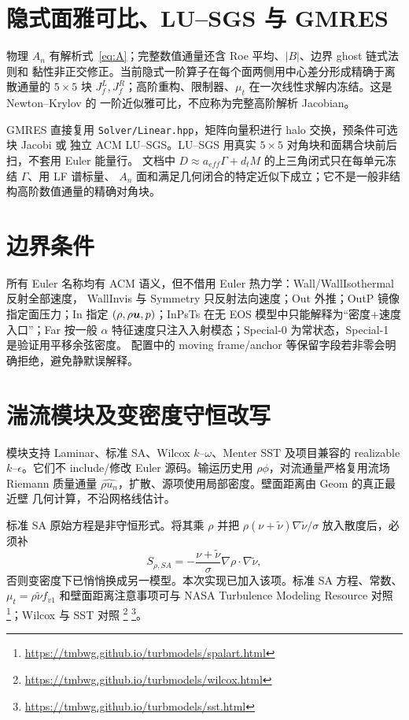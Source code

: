 \documentclass[UTF8,11pt,a4paper]{ctexart}
\begin{document}
\section{隐式面雅可比、LU--SGS 与 GMRES}
物理 $A_n$ 有解析式~\eqref{eq:A}；完整数值通量还含 Roe 平均、$|B|$、边界 ghost 链式法则和
黏性非正交修正。当前隐式一阶算子在每个面两侧用中心差分形成精确于离散通量的 $5\times5$
块 $J_f^L,J_f^R$；高阶重构、限制器、$\mu_t$ 在一次线性求解内冻结。这是 Newton--Krylov 的
一阶近似雅可比，不应称为完整高阶解析 Jacobian。

GMRES 直接复用 \texttt{Solver/Linear.hpp}，矩阵向量积进行 halo 交换，预条件可选块 Jacobi 或
独立 ACM LU--SGS。LU--SGS 用真实 $5\times5$ 对角块和面耦合块前后扫，不套用 Euler 能量行。
文档中 $D\approx a_{eff}\Gamma+d_tM$ 的上三角闭式只在每单元冻结 $\Gamma$、用 LF 谱标量、
$A_n$ 面和满足几何闭合的特定近似下成立；它不是一般非结构高阶数值通量的精确对角块。

\section{边界条件}
所有 Euler 名称均有 ACM 语义，但不借用 Euler 热力学：Wall/WallIsothermal 反射全部速度，
WallInvis 与 Symmetry 只反射法向速度；Out 外推；OutP 镜像指定面压力；In 指定
$(\rho,\rho\bm{u},p)$；InPsTs 在无 EOS 模型中只能解释为“密度+速度入口”；Far 按一般
$\alpha$ 特征速度只注入入射模态；Special-0 为常状态，Special-1 是验证用平移余弦密度。
配置中的 moving frame/anchor 等保留字段若非零会明确拒绝，避免静默误解释。

\section{湍流模块及变密度守恒改写}
模块支持 Laminar、标准 SA、Wilcox $k$--$\omega$、Menter SST 及项目兼容的 realizable
$k$--$\epsilon$。它们不 include/修改 Euler 源码。输运历史用 $\rho\phi$，对流通量严格复用流场
Riemann 质量通量 $\widehat{\rho u_n}$，扩散、源项使用局部密度。壁面距离由 Geom 的真正最近壁
几何计算，不沿网格线估计。

标准 SA 原始方程是非守恒形式。将其乘 $\rho$ 并把
$\rho(\nu+\tilde\nu)\nabla\tilde\nu/\sigma$ 放入散度后，必须补
\begin{equation}S_{\rho,SA}=-\frac{\nu+\tilde\nu}{\sigma}
\nabla\rho\cdot\nabla\tilde\nu,\end{equation}
否则变密度下已悄悄换成另一模型。本次实现已加入该项。标准 SA 方程、常数、$\mu_t=\rho
\tilde\nu f_{v1}$ 和壁面距离注意事项可与 NASA Turbulence Modeling Resource 对照
\footnote{\url{https://tmbwg.github.io/turbmodels/spalart.html}}；Wilcox 与 SST 对照
\footnote{\url{https://tmbwg.github.io/turbmodels/wilcox.html}}
\footnote{\url{https://tmbwg.github.io/turbmodels/sst.html}}。
\end{document}
